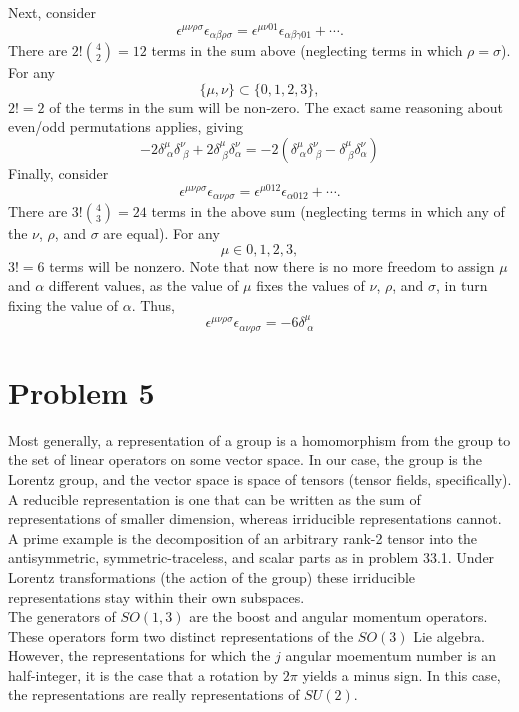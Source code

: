 \documentclass[12pt]{article}
\begin{document}
Next, consider
\[ \epsilon^{\mu\nu\rho\sigma}\epsilon_{\alpha\beta\rho\sigma} = \epsilon^{\mu\nu 01}\epsilon_{\alpha\beta\gamma 01} + \cdots . \]
There are $2!\binom{4}{2} = 12$ terms in the sum above (neglecting terms in which $\rho = \sigma$). For any
\[ \{\mu, \nu\} \subset \{0,1,2,3\}, \]
$2! = 2$ of the terms in the sum will be non-zero. The exact same reasoning about even/odd permutations applies, giving
\[ -2\delta_{\;\alpha}^\mu\delta_{\;\beta}^\nu + 2\delta_{\;\beta}^\mu\delta_{\alpha}^\nu = -2(\delta_{\;\alpha}^\mu\delta_{\;\beta}^\nu - \delta_{\;\beta}^\mu\delta_{\alpha}^\nu) \]
Finally, consider
\[ \epsilon^{\mu\nu\rho\sigma}\epsilon_{\alpha\nu\rho\sigma} = \epsilon^{\mu 012}\epsilon_{\alpha 012} + \cdots . \]
There are $3!\binom{4}{3} = 24$ terms in the above sum (neglecting terms in which any of the $\nu$, $\rho$, and $\sigma$ are equal). For any
\[ \mu \in {0,1,2,3}, \]
$3! = 6$ terms will be nonzero. Note that now there is no more freedom to assign $\mu$ and $\alpha$ different values, as the value of $\mu$ fixes the values of $\nu$, $\rho$, and $\sigma$, in turn fixing the value of $\alpha$. Thus,
\[ \epsilon^{\mu\nu\rho\sigma}\epsilon_{\alpha\nu\rho\sigma} = - 6\delta_{\;\alpha}^\mu \]


\section*{Problem 5}
Most generally, a representation of a group is a homomorphism from the group to the set of linear operators on some vector space. In our case, the group is the Lorentz group, and the vector space is space of tensors (tensor fields, specifically). A reducible representation is one that can be written as the sum of representations of smaller dimension, whereas irriducible representations cannot. A prime example is the decomposition of an arbitrary rank-2 tensor into the antisymmetric, symmetric-traceless, and scalar parts as in problem 33.1. Under Lorentz transformations (the action of the group) these irriducible representations stay within their own subspaces. \\
The generators of $SO(1,3)$ are the boost and angular momentum operators. These operators form two distinct representations of the $SO(3)$ Lie algebra. However, the representations for which the $j$ angular moementum number is an half-integer, it is the case that a rotation by $2\pi$ yields a minus sign. In this case, the representations are really representations of $SU(2)$.
\end{document}
